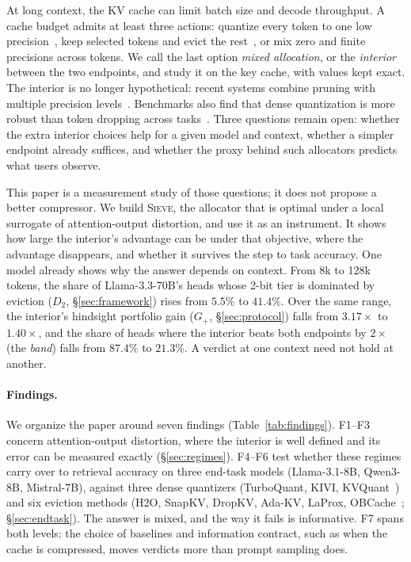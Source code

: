 \documentclass{article}
\newcommand{\sieve}{\textsc{Sieve}}
\newcommand{\gplus}{G_{+}}
\theoremstyle{definition}
\begin{document}
At long context, the KV cache can limit batch size and decode throughput.  A cache budget admits at least three actions: quantize every token to one low precision~\citep{liu2024kivi,hooper2024kvquant,zandieh2025turboquant}, keep selected tokens and evict the rest~\citep{zhang2023h2o,liu2023scissorhands,li2024snapkv,xiao2024streamingllm}, or mix zero and finite precisions across tokens.  We call the last option \emph{mixed allocation}, or the \emph{interior} between the two endpoints, and study it on the key cache, with values kept exact.  The interior is no longer hypothetical: recent systems combine pruning with multiple precision levels~\citep{zhang2025diffkv,wang-etal-2026-hqekv}.  Benchmarks also find that dense quantization is more robust than token dropping across tasks~\citep{yuan2024kvbench}.  Three questions remain open: whether the extra interior choices help for a given model and context, whether a simpler endpoint already suffices, and whether the proxy behind such allocators predicts what users observe.

This paper is a measurement study of those questions; it does not propose a better compressor.  We build \sieve{}, the allocator that is optimal under a local surrogate of attention-output distortion, and use it as an instrument.  It shows how large the interior's advantage can be under that objective, where the advantage disappears, and whether it survives the step to task accuracy.  One model already shows why the answer depends on context.  From 8k to 128k tokens, the share of Llama-3.3-70B's heads whose 2-bit tier is dominated by eviction ($D_2$, \S\ref{sec:framework}) rises from $5.5\%$ to $41.4\%$.  Over the same range, the interior's hindsight portfolio gain ($\gplus$, \S\ref{sec:protocol}) falls from $3.17\times$ to $1.40\times$, and the share of heads where the interior beats both endpoints by $2\times$ (the \emph{band}) falls from $87.4\%$ to $21.3\%$.  A verdict at one context need not hold at another.

\paragraph{Findings.}  We organize the paper around seven findings (Table~\ref{tab:findings}).  F1--F3 concern attention-output distortion, where the interior is well defined and its error can be measured exactly (\S\ref{sec:regimes}).  F4--F6 test whether these regimes carry over to retrieval accuracy on three end-task models (Llama-3.1-8B, Qwen3-8B, Mistral-7B), against three dense quantizers (TurboQuant, KIVI, KVQuant~\citep{zandieh2025turboquant,liu2024kivi,hooper2024kvquant}) and six eviction methods (H2O, SnapKV, DropKV, Ada-KV, LaProx, OBCache~\citep{zhang2023h2o,li2024snapkv,zhang2026dropkv,feng2024adakv,mai2026laprox,gu2026obcache}; \S\ref{sec:endtask}).  The answer is mixed, and the way it fails is informative.  F7 spans both levels: the choice of baselines and information contract, such as when the cache is compressed, moves verdicts more than prompt sampling does.
\end{document}
